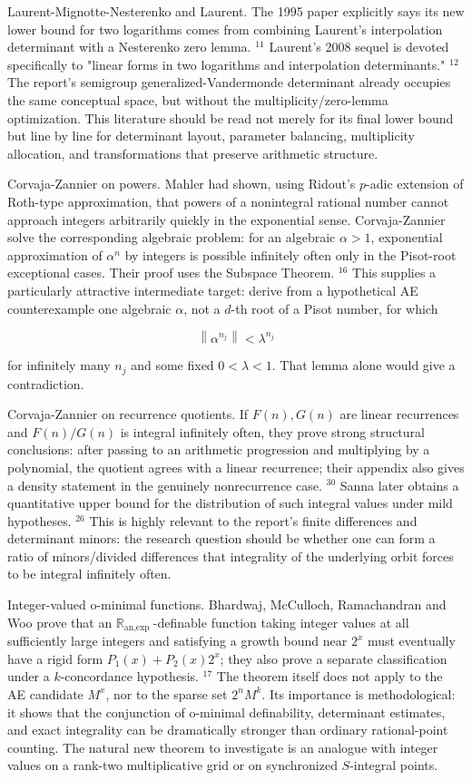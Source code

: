 \documentclass[10pt]{article}
\begin{document}
Laurent-Mignotte-Nesterenko and Laurent. The 1995 paper explicitly says its new lower bound for two logarithms comes from combining Laurent's interpolation determinant with a Nesterenko zero lemma. ${ }^{11}$ Laurent's 2008 sequel is devoted specifically to "linear forms in two logarithms and interpolation determinants." ${ }^{12}$ The report's semigroup generalized-Vandermonde determinant already occupies the same conceptual space, but without the multiplicity/zero-lemma optimization. This literature should be read not merely for its final lower bound but line by line for determinant layout, parameter balancing, multiplicity allocation, and transformations that preserve arithmetic structure.

Corvaja-Zannier on powers. Mahler had shown, using Ridout's $p$-adic extension of Roth-type approximation, that powers of a nonintegral rational number cannot approach integers arbitrarily quickly in the exponential sense. Corvaja-Zannier solve the corresponding algebraic problem: for an algebraic $\alpha>1$, exponential approximation of $\alpha^{n}$ by integers is possible infinitely often only in the Pisot-root exceptional cases. Their proof uses the Subspace Theorem. ${ }^{16}$ This supplies a particularly attractive intermediate target: derive from a hypothetical AE counterexample one algebraic $\alpha$, not a $d$-th root of a Pisot number, for which

$$
\left\|\alpha^{n_{j}}\right\|<\lambda^{n_{j}}
$$

for infinitely many $n_{j}$ and some fixed $0<\lambda<1$. That lemma alone would give a contradiction.

Corvaja-Zannier on recurrence quotients. If $F(n), G(n)$ are linear recurrences and $F(n) / G(n)$ is integral infinitely often, they prove strong structural conclusions: after passing to an arithmetic progression and multiplying by a polynomial, the quotient agrees with a linear recurrence; their appendix also gives a density statement in the genuinely nonrecurrence case. ${ }^{30}$ Sanna later obtains a quantitative upper bound for the distribution of such integral values under mild hypotheses. ${ }^{26}$ This is highly relevant to the report's finite differences and determinant minors: the research question should be whether one can form a ratio of minors/divided differences that integrality of the underlying orbit forces to be integral infinitely often.

Integer-valued o-minimal functions. Bhardwaj, McCulloch, Ramachandran and Woo prove that an $\mathbb{R}_{\text {an,exp }}$-definable function taking integer values at all sufficiently large integers and satisfying a growth bound near $2^{x}$ must eventually have a rigid form $P_{1}(x)+P_{2}(x) 2^{x}$; they also prove a separate classification under a $k$-concordance hypothesis. ${ }^{17}$ The theorem itself does not apply to the AE candidate $M^{x}$, nor to the sparse set $2^{n} M^{k}$. Its importance is methodological: it shows that the conjunction of o-minimal definability, determinant estimates, and exact integrality can be dramatically stronger than ordinary rational-point counting. The natural new theorem to investigate is an analogue with integer values on a rank-two multiplicative grid or on synchronized $S$-integral points.
\end{document}
